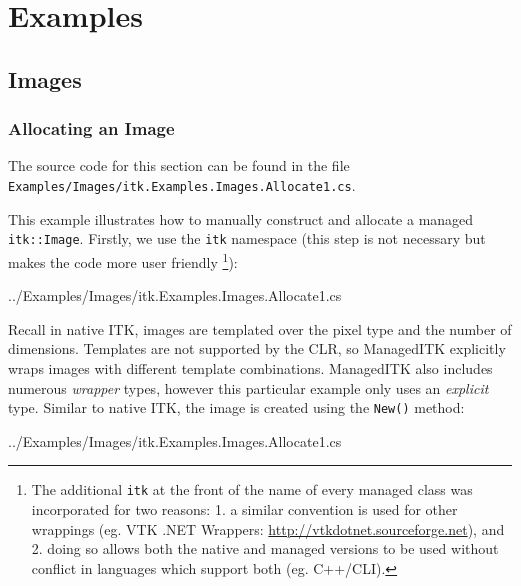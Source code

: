 \documentclass{InsightArticle}
\def\code#1{\texttt{#1}}
\begin{document}
\section{Examples}

\subsection{Images}

\subsubsection{Allocating an Image}
The source code for this section can be found in the file\\
\code{Examples/Images/itk.Examples.Images.Allocate1.cs}.

This example illustrates how to manually construct and allocate
a managed \code{itk::Image}. 
Firstly, we use the \code{itk} namespace (this step is not necessary but
makes the code more user friendly%
\footnote{The additional \code{itk} at the front of the name of every managed
class was incorporated for two reasons: 1. a similar convention is used for other
wrappings (eg. VTK .NET Wrappers: \href{http://vtkdotnet.sourceforge.net}{http://vtkdotnet.sourceforge.net}), 
and 2. doing so allows both the native and managed versions to be used 
without conflict in languages which support both (eg. C++/CLI).}):
\begin{center}
	
	{../Examples/Images/itk.Examples.Images.Allocate1.cs}
\end{center}

Recall in native ITK, images are templated over the pixel type
and the number of dimensions. Templates are not supported by the CLR,
so ManagedITK explicitly wraps images with different template 
combinations. ManagedITK also includes numerous \emph{wrapper} types,
however this particular example only uses an \emph{explicit} type.
Similar to native ITK, the image is created using 
the \code{New()} method:
\begin{center}
	
	{../Examples/Images/itk.Examples.Images.Allocate1.cs}
\end{center}
\end{document}
